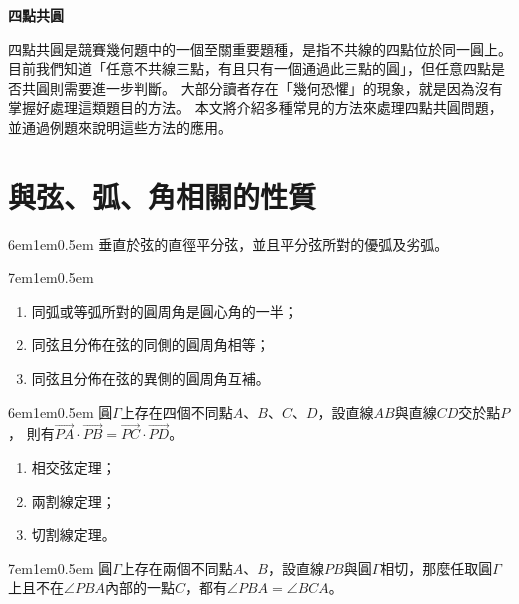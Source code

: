 \documentclass[12pt]{article}
\begin{document}
\thispagestyle{fancy}  %
\begin{center}
    \textbf{\Large{四點共圓}}
\end{center}
四點共圓是競賽幾何題中的一個至關重要題種，是指不共線的四點位於同一圓上。
目前我們知道「任意不共線三點，有且只有一個通過此三點的圓」，但任意四點是否共圓則需要進一步判斷。
大部分讀者存在「幾何恐懼」的現象，就是因為沒有掌握好處理這類題目的方法。
本文將介紹多種常見的方法來處理四點共圓問題，並通過例題來說明這些方法的應用。

\section{與弦、弧、角相關的性質}
\begin{mybox}[垂徑定理]{6em}{1em}{0.5em}
    垂直於弦的直徑平分弦，並且平分弦所對的優弧及劣弧。
\end{mybox}
\begin{mybox}[圓周角定理]{7em}{1em}{0.5em}
    \begin{enumerate}[label= \arabic*., itemsep=0.2em]
        \item 同弧或等弧所對的圓周角是圓心角的一半；
        \item 同弦且分佈在弦的同側的圓周角相等；
        \item 同弦且分佈在弦的異側的圓周角互補。
    \end{enumerate}
\end{mybox}
\begin{mybox}[圓冪定理]{6em}{1em}{0.5em}
    圓$\Gamma$上存在四個不同點$A$、$B$、$C$、$D$，設直線$AB$與直線$CD$交於點$P$，
    則有$\overrightarrow{PA}\cdot\overrightarrow{PB}=\overrightarrow{PC}\cdot\overrightarrow{PD}$。
    \begin{enumerate}[label= \arabic*., itemsep=0.2em]
        \item 相交弦定理；
        \item 兩割線定理；
        \item 切割線定理。
    \end{enumerate}
\end{mybox}
\begin{mybox}[弦切角定理]{7em}{1em}{0.5em}
    圓$\Gamma$上存在兩個不同點$A$、$B$，設直線$PB$與圓$\Gamma$相切，那麼任取圓$\Gamma$上且不在$\angle{PBA}$內部的一點$C$，都有$\angle{PBA}=\angle{BCA}$。
\end{mybox}
\newpage
\end{document}
